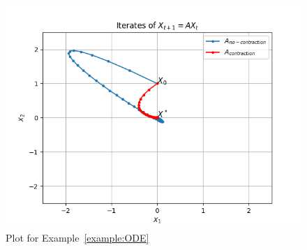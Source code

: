 \begin{figure}[t]
    \centering
\includegraphics[width=0.7\linewidth]{figures/ode.png}   \caption{Plot for Example~\ref{example:ODE} }
    \label{fig:example:ODE}
\end{figure}


